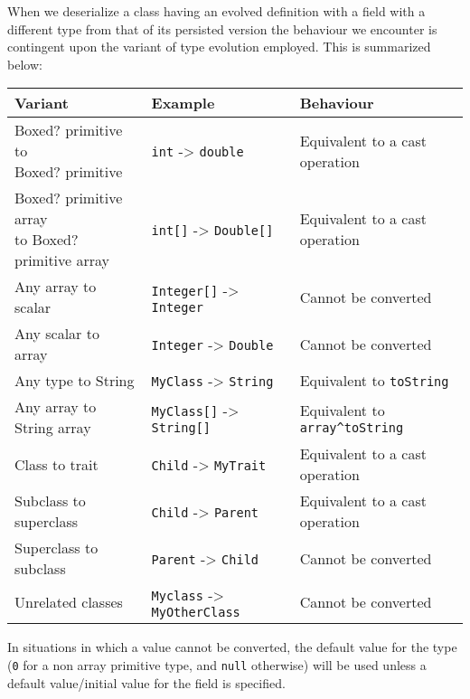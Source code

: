 \documentclass[conc-doc]{subfiles}
\begin{document}
When we deserialize a class having an evolved definition with a field with a different type from that of its persisted version the behaviour we encounter is contingent upon the variant of type evolution employed. This is summarized below:


\begin{table}[H]
	\centering
	\begin{tabular}{lll}
		\hline
		Variant&Example&Behaviour\\
		\hline\hline
		\makecell[l]{Boxed? primitive to\\Boxed? primitive}&\lstinline!int! -> \lstinline!double!&Equivalent to a cast operation\\ \hline
		
		\makecell[l]{Boxed? primitive array\\to Boxed? primitive array}&\lstinline!int[]! -> \lstinline!Double[]!&Equivalent to a cast operation\\ \hline
		
		Any array to scalar&\lstinline!Integer[]! -> \lstinline!Integer!&Cannot be converted\\ \hline
		Any scalar to array&\lstinline!Integer! -> \lstinline!Double!&Cannot be converted\\ \hline
		
		Any type to String&\lstinline!MyClass! -> \lstinline!String!&Equivalent to \lstinline!toString!\\ \hline
		Any array to String array&\lstinline!MyClass[]! -> \lstinline!String[]!&Equivalent to \lstinline!array^toString!\\ \hline
		
		Class to trait&\lstinline!Child! -> \lstinline!MyTrait!&Equivalent to a cast operation\\ \hline
		Subclass to superclass&\lstinline!Child! -> \lstinline!Parent!&Equivalent to a cast operation\\ \hline
		Superclass to subclass&\lstinline!Parent! -> \lstinline!Child!&Cannot be converted\\ \hline
		
		Unrelated classes&\lstinline!Myclass! -> \lstinline!MyOtherClass!&Cannot be converted\\
		\hline
	\end{tabular}
\end{table}

In situations in which a value cannot be converted, the default value for the type (\lstinline{0} for a non array primitive type, and \lstinline{null} otherwise) will be used unless a default value/initial value for the field is specified.
\end{document}
